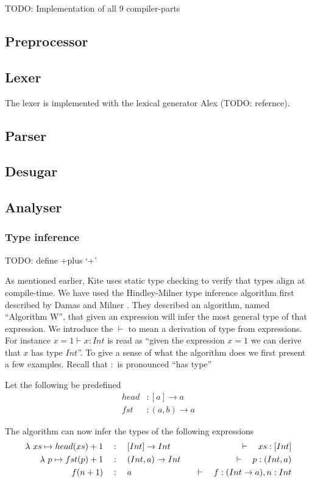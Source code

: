 
TODO: Implementation of all 9 compiler-parts

\subsection{Preprocessor}
\subsection{Lexer}
The lexer is implemented with the lexical generator Alex \cite{dornan01} (TODO: refernce).

\subsection{Parser}
\subsection{Desugar}
\subsection{Analyser}

\subsubsection{Type inference}

TODO: define +plus `+'

As mentioned earlier, Kite uses static type checking to verify that types align at compile-time. We have used the Hindley-Milner type inference algorithm first described by Damas and Milner \cite{milner82}. They described an algorithm, named ``Algorithm W'', that given an expression will infer the most general type of that expression. We introduce the $\vdash$ to mean a derivation of type from expressions. For instance $x = 1 \vdash x : Int$ is read as ``given the expression $x = 1$ we can derive that $x$ has type $Int$''. To give a sense of what the algorithm does we first present a few examples. Recall that $:$ is pronounced ``has type''

Let the following be predefined
\begin{align*}
  head   & : [a] \to a   \\
  fst    & : (a, b) \to a
\end{align*}

The algorithm can now infer the types of the following expressions
\begin{align*}
  \lambda{} \ xs \mapsto{} head(xs) + 1 & \quad:\quad [Int] \to Int    & \quad\vdash\quad xs : [Int]             \\
  \lambda{} \ p \mapsto{} fst(p) + 1    & \quad:\quad (Int, a) \to Int & \quad\vdash\quad p : (Int, a)           \\
  f(n + 1)              & \quad:\quad a                & \quad\vdash\quad f: (Int \to a), n: Int \\
\end{align*}

